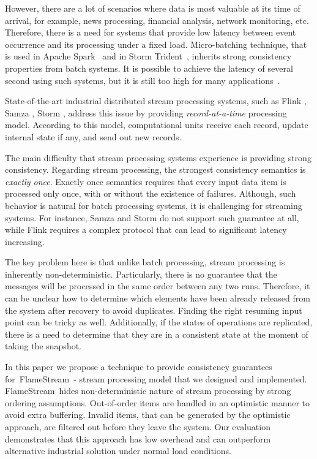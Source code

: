 \documentclass[sigconf]{acmart}
\theoremstyle{remark}
\newcommand {\FlameStream} {FlameStream}
\begin{document}
However, there are a lot of scenarios where data is most valuable at its time of arrival, for example, news processing, financial analysis, network monitoring, etc. Therefore, there is a need for systems that provide low latency between event occurrence and its processing under a fixed load. Micro-batching technique, that is used in Apache Spark~\cite{Zaharia:2012:DSE:2342763.2342773} and in Storm Trident~\cite{apache:storm:trident}, inherits strong consistency properties from batch systems. It is possible to achieve the latency of several second using such systems, but it is still too high for many applications~\cite{?}.

State-of-the-art industrial distributed stream processing systems, such as Flink \cite{carbone2015apache}, Samza \cite{Noghabi:2017:SSS:3137765.3137770}, Storm \cite{apache:storm}, address this issue by providing {\it record-at-a-time} processing model. According to this model, computational units receive each record, update internal state if any, and send out new records. 

The main difficulty that stream processing systems experience is providing strong consistency. Regarding stream processing, the strongest consistency semantics is {\it exactly once}. Exactly once semantics requires that every input data item is processed only once, with or without the existence of failures. Although, such behavior is natural for batch processing systems, it is challenging for streaming systems. For instance, Samza and Storm do not support such guarantee at all, while Flink requires a complex protocol that can lead to significant latency increasing.

The key problem here is that unlike batch processing, stream processing is inherently non-deterministic. Particularly, there is no guarantee that the messages will be processed in the same order between any two runs. Therefore, it can be unclear how to determine which elements have been already released from the system after recovery to avoid duplicates. Finding the right resuming input point can be tricky as well. Additionally, if the states of operations are replicated, there is a need to determine that they are in a consistent state at the moment of taking the snapshot. 

In this paper we propose a technique to provide consistency guarantees for~\FlameStream\ - stream processing model that we designed and implemented. \FlameStream\ hides non-deterministic nature of stream processing by strong ordering assumptions. Out-of-order items are handled in an optimistic manner to avoid extra buffering. Invalid items, that can be generated by the optimistic approach, are filtered out before they leave the system. Our evaluation demonstrates that this approach has low overhead and can outperform alternative industrial solution under normal load conditions.
\end{document}
